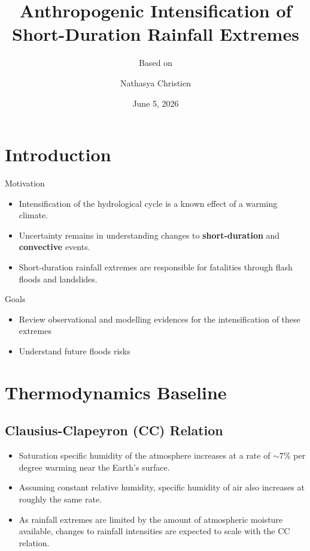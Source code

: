 \documentclass[
11pt,notheorems,hyperref={pdfauthor=whatever}
]{beamer}
\title[
Anthropogenic Intensification of Short-Duration Rainfall Extremes
]{Anthropogenic Intensification of \\Short-Duration Rainfall Extremes}
\subtitle{Based on \citet{fowler2021}}
\author[
]{
    Nathasya Christien 
}
\institute{
    Earth System Modelling \\
    Earth System Physics \\
    ICTP}
\date{June 5, 2026}
\begin{document}
{
\begin{frame}
  \titlepage
\end{frame}
}
\addtocounter{framenumber}{-1}


\section{Introduction}

\begin{frame}
    \begin{block}{Motivation}
        \begin{itemize}
            \item Intensification of the hydrological cycle is a known effect of a warming climate.%
            \item Uncertainty remains in understanding changes to \textbf{short-duration} and \textbf{convective} events.
            \item Short-duration rainfall extremes are responsible for fatalities through flash floods and landslides.
        \end{itemize}
        
    \end{block}

    \begin{block}{Goals}
        \begin{itemize}
            \item Review observational and modelling evidences for the intensification of these extremes
            \item Understand future floods risks
        \end{itemize}
    \end{block}
\end{frame}

\section{Thermodynamics Baseline}

\subsection{Clausius-Clapeyron (CC) Relation}
\begin{frame}
    \begin{itemize}
        \item Saturation specific humidity of the atmosphere increases at a rate of $\sim7\%$ per degree warming near the Earth's surface. 
        \item Assuming constant relative humidity, specific humidity of air also increases at roughly the same rate.
        \item As rainfall extremes are limited by the amount of atmospheric moisture available, changes to rainfall intensities are expected to scale with the CC relation.
    \end{itemize}
\end{frame}
\end{document}
